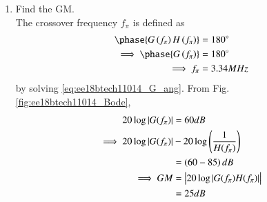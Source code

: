 \begin{enumerate}[label=\thesection.\arabic*.,ref=\thesection.\theenumi]
\item Find the GM.
\\
\solution The crossover frequency $f_{\pi}$ is defined as 
\begin{align}
\phase{G\brak{f_{\pi}}H\brak{f_{\pi}}} &= 180 \degree
\\
\implies \phase{G\brak{f_{\pi}}} &= 180 \degree
\\
\implies f_{\pi} &= 3.34 MHz
\end{align}
by solving \eqref{eq:ee18btech11014_G_ang}.
From Fig. \ref{fig:ee18btech11014_Bode}, 
\begin{align}
\label{eq:ee18btech11014_G_f1}
20 \log \left\vert G(f_\pi)\right\vert &= 60 dB
\\
\implies 20 \log \left\vert G(f_\pi)\right\vert &-  20 \log \left(\frac{1}{H(f_\pi) }\right)   
\nonumber \\
&= \left(60 -85\right) dB
\\
\implies GM &= \left\vert20 \log \left\vert G(f_\pi)H(f_\pi) \right\vert\right\vert 
\nonumber \\
&= 25 dB
\end{align}
%


\end{enumerate}
